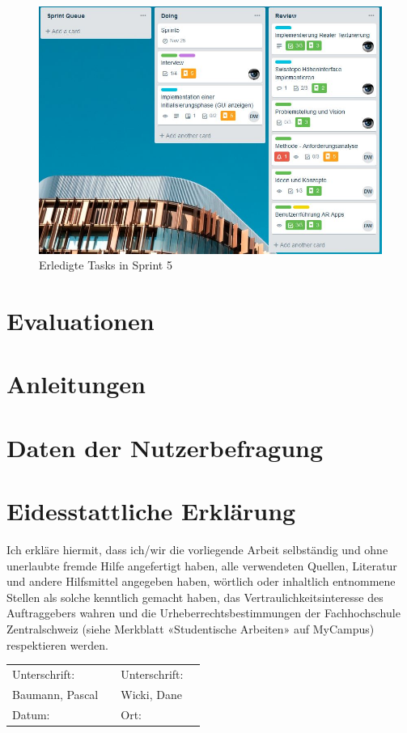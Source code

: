 \documentclass[a4paper]{scrreprt}
\begin{document}
\newpage

\begin{figure}[h!]
	\includegraphics[keepaspectratio,width=\textwidth]{SprintReview_5}
	\caption{Erledigte Tasks in Sprint 5}
\end{figure}

\newpage

\chapter{Evaluationen}



\chapter{Anleitungen}



\chapter{Daten der Nutzerbefragung}



\chapter*{Eidesstattliche Erklärung}
Ich erkläre hiermit, dass ich/wir die vorliegende Arbeit selbständig und ohne unerlaubte fremde Hilfe angefertigt haben, alle verwendeten Quellen, Literatur und andere Hilfsmittel angegeben haben, wörtlich oder inhaltlich entnommene Stellen als solche kenntlich gemacht haben, das Vertraulichkeitsinteresse des Auftraggebers wahren und die Urheberrechtsbestimmungen der Fachhochschule Zentralschweiz (siehe Merkblatt «Studentische Arbeiten» auf MyCampus) respektieren werden.

\vspace{1em}

\renewcommand{\arraystretch}{2}
\begin{tabularx}{\textwidth}{XXXX}
	Unterschrift: & & Unterschrift: & \\ \cline{2-2}\cline{4-4}
	Baumann, Pascal & & Wicki, Dane & \\
	Datum: & & Ort: & \\
\end{tabularx}
\end{document}
